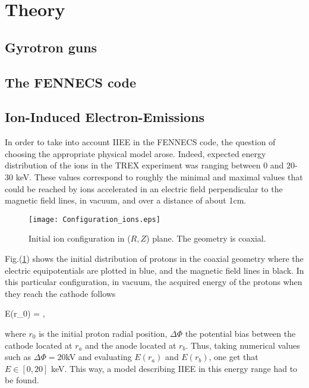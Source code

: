 \section{Theory}\label{Theory}

\subsection{Gyrotron guns}

\subsection{The FENNECS code}

\subsection{Ion-Induced Electron-Emissions}

In order to take into account IIEE in the FENNECS code, the question of choosing the appropriate physical model arose. Indeed, expected energy distribution of the ions in the TREX experiment was ranging between 0 and 20-30 keV. These values correspond to roughly the minimal and maximal values that could be reached by ions accelerated in an electric field perpendicular to the magnetic field lines, in vacuum, and over a distance of about 1cm.
 
\begin{figure}[h!]
\centering
	\texttt{[image: Configuration\_ions.eps]}
	\caption{\label{Config_ions} Initial ion configuration in ($R,Z$) plane. The geometry is coaxial.}
\end{figure}  

\noindent Fig.(\ref{Config_ions}) shows the initial distribution of protons in the coaxial geometry where the electric equipotentials are plotted in blue, and the magnetic field lines in black. In this particular configuration, in vacuum, the acquired energy of the protons when they reach the cathode follows 

\beq
E(r_0) = \Delta \Phi {},
\eeq

\noindent where $r_0$ is the initial proton radial position, $\Delta \Phi$ the potential bias between the cathode located at $r_a$ and the anode located at $r_b$. Thus, taking numerical values such as $\Delta \Phi = 20$kV and evaluating $E(r_a)$ and $E(r_b)$, one get that $E\in [0,20]$ keV. This way, a model describing IIEE in this energy range had to be found. 

